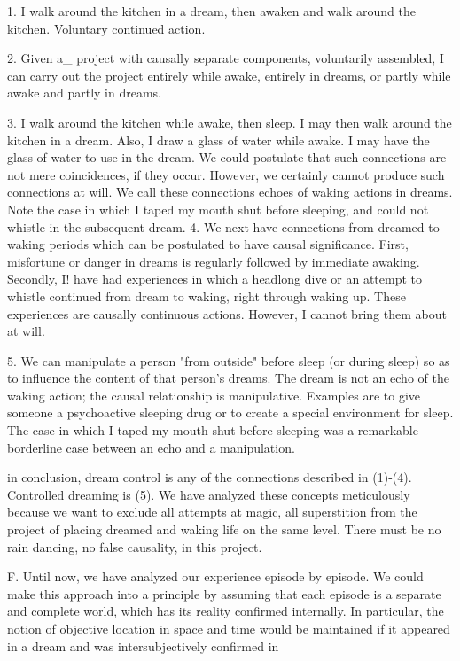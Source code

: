 \documentclass[10pt,twoside]{memoir}
\begin{document}
\begin{enumerate}
{{1. I walk around the kitchen in a dream, then awaken and walk around the 
kitchen. Voluntary continued action. 

2. Given a_ project with causally separate components, voluntarily 
assembled, I can carry out the project entirely while awake, entirely in 
dreams, or partly while awake and partly in dreams. 

3. I walk around the kitchen while awake, then sleep. I may then walk 
around the kitchen in a dream. Also, I draw a glass of water while awake. I 
may have the glass of water to use in the dream. We could postulate that 
such connections are not mere coincidences, if they occur. However, we 
certainly cannot produce such connections at will. We call these connections 
echoes of waking actions in dreams. Note the case in which I taped my 
mouth shut before sleeping, and could not whistle in the subsequent dream. 
4. We next have connections from dreamed to waking periods which can be 
postulated to have causal significance. First, misfortune or danger in dreams 
is regularly followed by immediate awaking. Secondly, I! have had 
experiences in which a headlong dive or an attempt to whistle continued 
from dream to waking, right through waking up. These experiences are 
causally continuous actions. However, I cannot bring them about at will. 

5. We can manipulate a person "from outside" before sleep (or during sleep) 
so as to influence the content of that person's dreams. The dream is not an 
echo of the waking action; the causal relationship is manipulative. Examples 
are to give someone a psychoactive sleeping drug or to create a special 
environment for sleep. The case in which I taped my mouth shut before 
sleeping was a remarkable borderline case between an echo and a 
manipulation. 

in conclusion, dream control is any of the connections described in 
(1)-(4). Controlled dreaming is (5). We have analyzed these concepts 
meticulously because we want to exclude all attempts at magic, all 
superstition from the project of placing dreamed and waking life on the same 
level. There must be no rain dancing, no false causality, in this project. 

F. Until now, we have analyzed our experience episode by episode. We 
could make this approach into a principle by assuming that each episode is a 
separate and complete world, which has its reality confirmed internally. In 
particular, the notion of objective location in space and time would be 
maintained if it appeared in a dream and was intersubjectively confirmed in 


}}
\end{enumerate}
\end{document}
